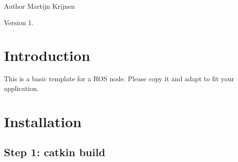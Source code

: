 \begin{DoxyAuthor}{Author}
Martijn Krijnen 
\end{DoxyAuthor}
\begin{DoxyVersion}{Version}
1. 
\end{DoxyVersion}
\hypertarget{index_intro}{}\section{Introduction}\label{index_intro}
This is a basic template for a R\+OS node. Please copy it and adapt to fit your application. \hypertarget{index_install}{}\section{Installation}\label{index_install}
\hypertarget{index_step1}{}\subsection{Step 1\+: catkin build}\label{index_step1}
